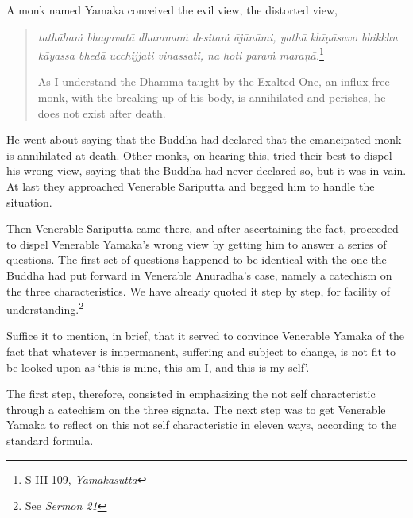 A monk named Yamaka conceived the evil view, the distorted view,

\begin{quote}
\emph{tathāhaṁ bhagavatā dhammaṁ desitaṁ ājānāmi, yathā khīṇāsavo bhikkhu kāyassa bhedā ucchijjati vinassati, na hoti paraṁ maraṇā.}\footnote{S III 109, \emph{Yamakasutta}}

As I understand the Dhamma taught by the Exalted One, an influx-free monk, with the breaking up of his body, is annihilated and perishes, he does not exist after death.
\end{quote}

He went about saying that the Buddha had declared that the emancipated monk is annihilated at death. Other monks, on hearing this, tried their best to dispel his wrong view, saying that the Buddha had never declared so, but it was in vain. At last they approached Venerable Sāriputta and begged him to handle the situation.

Then Venerable Sāriputta came there, and after ascertaining the fact, proceeded to dispel Venerable Yamaka's wrong view by getting him to answer a series of questions. The first set of questions happened to be identical with the one the Buddha had put forward in Venerable Anurādha's case, namely a catechism on the three characteristics. We have already quoted it step by step, for facility of understanding.\footnote{See \emph{Sermon 21}}

Suffice it to mention, in brief, that it served to convince Venerable Yamaka of the fact that whatever is impermanent, suffering and subject to change, is not fit to be looked upon as `this is mine, this am I, and this is my self'.

The first step, therefore, consisted in emphasizing the not self characteristic through a catechism on the three signata. The next step was to get Venerable Yamaka to reflect on this not self characteristic in eleven ways, according to the standard formula.

